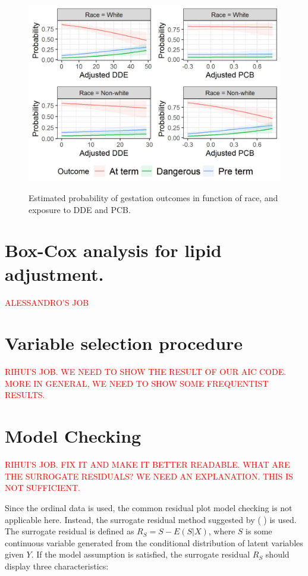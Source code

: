 \documentclass[wcp]{jmlr}%
\begin{document}
\begin{figure}[htbp]
	\centering
	\caption{Estimated probability of gestation outcomes in function of race, and exposure to DDE and PCB.}
	\includegraphics[width=0.7\linewidth]{results}
	\label{fig:results}
\end{figure}


\newpage %


\section{Box-Cox analysis for lipid adjustment.}
\textcolor{red}{ALESSANDRO'S JOB}
\section{Variable selection procedure}
\textcolor{red}{RIHUI'S JOB. WE NEED TO SHOW THE RESULT OF OUR AIC CODE. MORE IN GENERAL, WE NEED TO SHOW SOME FREQUENTIST RESULTS.}
\section{Model Checking}
\textcolor{red}{RIHUI'S JOB. FIX IT AND MAKE IT BETTER READABLE. WHAT ARE THE SURROGATE RESIDUALS? WE NEED AN EXPLANATION. THIS IS NOT SUFFICIENT.}

Since the ordinal data is used, the common residual plot model checking is not applicable here. Instead, the surrogate residual method suggested by (%
) is used. The surrogate residual is defined as $R_S=S-E(S|X)$, where $S$ is some continuous variable generated from the conditional distribution of latent variables given $Y$. If the model assumption is satisfied, the surrogate residual $R_S$ should display three characteristics: 
\end{document}
